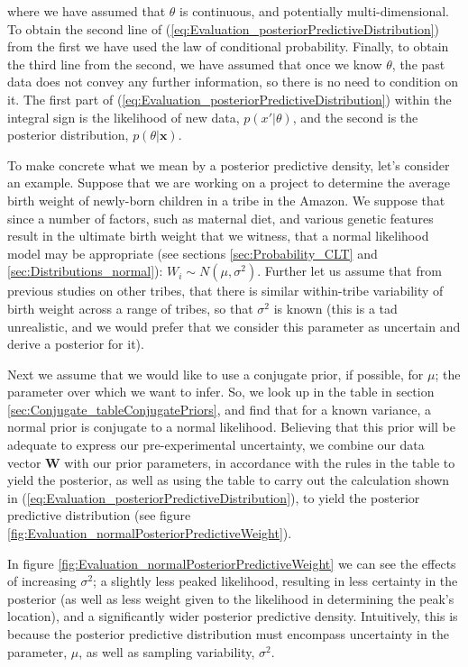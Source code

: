 \documentclass[11pt,fullpage]{book}
\begin{document}
where we have assumed that $\theta$ is continuous, and potentially multi-dimensional. To obtain the second line of (\ref{eq:Evaluation_posteriorPredictiveDistribution}) from the first we have used the law of conditional probability. Finally, to obtain the third line from the second, we have assumed that once we know $\theta$, the past data does not convey any further information, so there is no need to condition on it. The first part of (\ref{eq:Evaluation_posteriorPredictiveDistribution}) within the integral sign is the likelihood of new data, $p(x'|\theta)$, and the second is the posterior distribution, $p(\theta|\boldsymbol{x})$. 

To make concrete what we mean by a posterior predictive density, let's consider an example. Suppose that we are working on a project to determine the average birth weight of newly-born children in a tribe in the Amazon. We suppose that since a number of factors, such as maternal diet, and various genetic features result in the ultimate birth weight that we witness, that a normal likelihood model may be appropriate (see sections \ref{sec:Probability_CLT} and \ref{sec:Distributions_normal}): $W_i\sim N(\mu,\sigma^2)$. Further let us assume that from previous studies on other tribes, that there is similar within-tribe variability of birth weight across a range of tribes, so that $\sigma^2$ is known (this is a tad unrealistic, and we would prefer that we consider this parameter as uncertain and derive a posterior for it). 

Next we assume that we would like to use a conjugate prior, if possible, for $\mu$; the parameter over which we want to infer. So, we look up in the table in section \ref{sec:Conjugate_tableConjugatePriors}, and find that for a known variance, a normal prior is conjugate to a normal likelihood. Believing that this prior will be adequate to express our pre-experimental uncertainty, we combine our data vector $\boldsymbol{W}$ with our prior parameters, in accordance with the rules in the table to yield the posterior, as well as using the table to carry out the calculation shown in (\ref{eq:Evaluation_posteriorPredictiveDistribution}), to yield the posterior predictive distribution (see figure \ref{fig:Evaluation_normalPosteriorPredictiveWeight}).

In figure \ref{fig:Evaluation_normalPosteriorPredictiveWeight} we can see the effects of increasing $\sigma^2$; a slightly less peaked likelihood, resulting in less certainty in the posterior (as well as less weight given to the likelihood in determining the peak's location), and a significantly wider posterior predictive density. Intuitively, this is because the posterior predictive distribution must encompass uncertainty in the parameter, $\mu$, as well as sampling variability, $\sigma^2$. 
\end{document}
